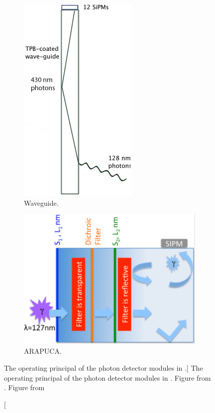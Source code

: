 \begin{figure}

	\centering

	\begin{subfigure}[b]{0.28\textwidth}
		\centering
		\includegraphics[height=0.3\textheight]{figures/pdsp_pd.pdf}
		\caption{Waveguide.}
		\label{fig:pd_bars}
	\end{subfigure}
	\hfill
	\begin{subfigure}[b]{0.67\textwidth}
		\centering
		\includegraphics[height=0.3\textheight]{figures/pdsp_arapuca.pdf}
		\caption{ARAPUCA.}
		\label{fig:arapuca}
	\end{subfigure}

	\caption
	[The operating principal of the photon detector modules in \protodune{}.]
	{The operating principal of the photon detector modules in \protodune{}.
	Figure  from \cite{Abi2017}. Figure  
	from \cite{Machado:2016jqe}}

	\label{fig:pdsp_pd}

\end{figure}

